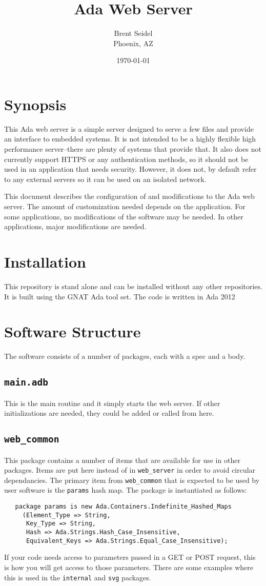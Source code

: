 \documentclass[10pt, openany, draft]{article}
\title{Ada Web Server}
\author{Brent Seidel \\ Phoenix, AZ}
\date{ \today }
\begin{document}
\maketitle
\section{Synopsis}
This Ada web server is a simple server designed to serve a few files and provide an interface to embedded systems.  It is not intended to be a highly flexible high performance server--there are plenty of systems that provide that.  It also does not currently support HTTPS or any authentication methods, so it should not be used in an application that needs security.  However, it does not, by default refer to any external servers so it can be used on an isolated network.

This document describes the configuration of and modifications to the Ada web server.  The amount of customization needed depends on the application.  For some applications, no modifications of the software may be needed.  In other applications, major modifications are needed.

\section{Installation}
This repository is stand alone and can be installed without any other repositories.  It is built using the GNAT Ada tool set.  The code is written in Ada 2012

\section{Software Structure}
The software consists of a number of packages, each with a spec and a body.

\subsection{\texttt{main.adb}}
This is the main routine and it simply starts the web server.  If other initializations are needed, they could be added or called from here.

\subsection{\texttt{web\_common}}
This package contains a number of items that are available for use in other packages.  Items are put here instead of in \texttt{web\_server} in order to avoid circular dependancies.  The primary item from \texttt{web\_common} that is expected to be used by user software is the \texttt{params} hash map.  The package is instantiated as follows:
\begin{verbatim}
   package params is new Ada.Containers.Indefinite_Hashed_Maps
     (Element_Type => String,
      Key_Type => String,
      Hash => Ada.Strings.Hash_Case_Insensitive,
      Equivalent_Keys => Ada.Strings.Equal_Case_Insensitive);
\end{verbatim}
If your code needs access to parameters passed in a GET or POST request, this is how you will get access to those parameters.  There are some examples where this is used in the \texttt{internal} and \texttt{svg} packages.
\end{document}
